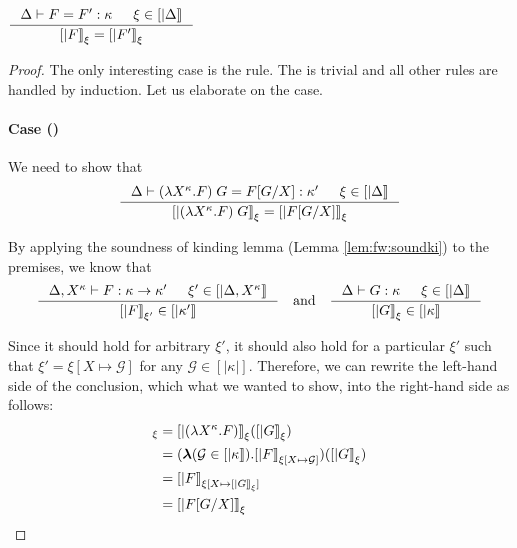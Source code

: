 \begin{lemma} \label{lem:fw:soundtyeq}
$ \inference{\Delta |- F = F' : \kappa & \xi\in[|\Delta|]}
	{[|F|]_\xi = [|F'|]_\xi} $
\end{lemma}
\begin{proof}
The only interesting case is the  rule.
The  is trivial and all other rules are handled by induction.
Let us elaborate on the  case.

\paragraph{Case ()} We need to show that
\[ \inference
	{ \Delta |- (\l X^\kappa.F)\;G = F[G/X] : \kappa' & \xi\in[|\Delta|] }
	{ [| (\l X^\kappa.F)\;G |]_\xi = [| F[G/X] |]_\xi }
\]

By applying the soundness of kinding lemma (Lemma \ref{lem:fw:soundki})
to the premises, we know that
\[ \inference
	{\Delta,X^\kappa |- F : \kappa -> \kappa' & \xi'\in[|\Delta,X^\kappa|]}
	{[|F|]_{\xi'} \in [|\kappa'|]}
\quad\text{and}\quad
   \inference{\Delta |- G : \kappa & \xi\in[|\Delta|]}{[|G|]_\xi \in [|\kappa|]}
\]

Since it should hold for arbitrary $\xi'$, it should also hold for
a particular $\xi'$ such that $\xi'=\xi[X\mapsto\mathcal{G}]$
for any $\mathcal{G} \in [|\kappa|]$. Therefore, we can rewrite
the left-hand side of the conclusion, which what we wanted to show,
into the right-hand side as follows:
\begin{align*}
[| (\l X^\kappa.F)\;G |]_\xi
&=[|(\l X^\kappa.F)|]_\xi ([|G|]_\xi) \\
&=(\bbl(\mathcal{G}\in[|\kappa|]).[|F|]_{\xi[X\mapsto\mathcal{G}]})([|G|]_\xi)\\
&=[|F|]_{\xi[X\mapsto[|G|]_\xi]} \\
&=[|F[G/X]|]_\xi
\end{align*}
\end{proof}

